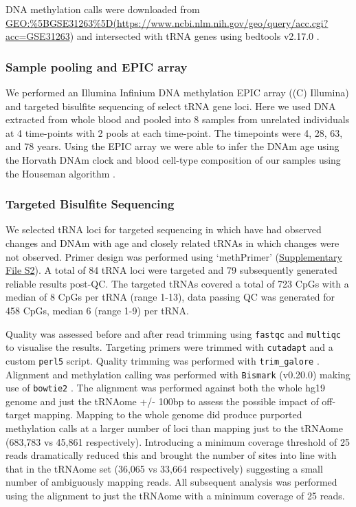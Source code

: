 \documentclass[
]{book}
\begin{document}
DNA methylation calls were downloaded from \url{GEO:\%5BGSE31263\%5D(https://www.ncbi.nlm.nih.gov/geo/query/acc.cgi?acc=GSE31263}) and intersected with tRNA genes using bedtools v2.17.0 \citep{Quinlan2010}.

\hypertarget{sample-pooling-and-epic-array}{%
\subsubsection{Sample pooling and EPIC array}\label{sample-pooling-and-epic-array}}

We performed an Illumina Infinium DNA methylation EPIC array ((C) Illumina) and targeted bisulfite sequencing of select tRNA gene loci.
Here we used DNA extracted from whole blood and pooled into 8 samples from unrelated individuals at 4 time-points with 2 pools at each time-point.
The timepoints were 4, 28, 63, and 78 years.
Using the EPIC array we were able to infer the DNAm age using the Horvath DNAm clock \citep{Horvath2013} and blood cell-type composition of our samples using the Houseman algorithm \citep{Houseman2012}.

\hypertarget{targetedBiSseq}{%
\subsubsection{Targeted Bisulfite Sequencing}\label{targetedBiSseq}}

We selected tRNA loci for targeted sequencing in which have had observed changes and DNAm with age and closely related tRNAs in which changes were not observed.
Primer design was performed using `methPrimer' \citep{Li2002} (\href{./Supplementary_Files/Targeted_BiS-seq_Primers.txt}{Supplementary File S2}).
A total of 84 tRNA loci were targeted and 79 subsequently generated reliable results post-QC.
The targeted tRNAs covered a total of 723 CpGs with a median of 8 CpGs per tRNA (range 1-13), data passing QC was generated for 458 CpGs, median 6 (range 1-9) per tRNA.

Quality was assessed before and after read trimming using \texttt{fastqc} \citep{Andrews2010} and \texttt{multiqc} \citep{Ewels2016} to visualise the results.
Targeting primers were trimmed with \texttt{cutadapt} \citep{Martin2011} and a custom \texttt{perl5} script.
Quality trimming was performed with \texttt{trim\_galore} \citep{Krueger2015}.
Alignment and methylation calling was performed with \texttt{Bismark} (v0.20.0) \citep{Krueger2011} making use of \texttt{bowtie2} \citep{Langmead2012}.
The alignment was performed against both the whole hg19 genome and just the tRNAome +/- 100bp to assess the possible impact of off-target mapping. Mapping to the whole genome did produce purported methylation calls at a larger number of loci than mapping just to the tRNAome (683,783 vs 45,861 respectively).
Introducing a minimum coverage threshold of 25 reads dramatically reduced this and brought the number of sites into line with that in the tRNAome set (36,065 vs 33,664 respectively) suggesting a small number of ambiguously mapping reads. All subsequent analysis was performed using the alignment to just the tRNAome with a minimum coverage of 25 reads.
\end{document}

